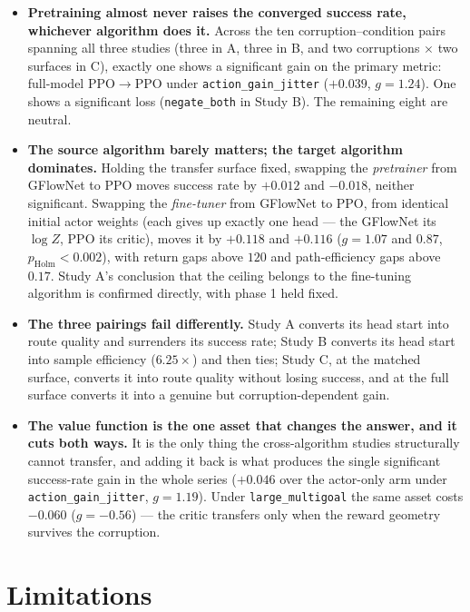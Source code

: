 \begin{itemize}
  \item \textbf{Pretraining almost never raises the converged success rate, whichever algorithm does it.} Across the ten corruption--condition pairs spanning all three studies (three in A, three in B, and two corruptions $\times$ two surfaces in C), exactly one shows a significant gain on the primary metric: full-model PPO$\rightarrow$PPO under \texttt{action\_gain\_jitter} ($+0.039$, $g=1.24$). One shows a significant loss (\texttt{negate\_both} in Study B). The remaining eight are neutral.
  \item \textbf{The source algorithm barely matters; the target algorithm dominates.} Holding the transfer surface fixed, swapping the \emph{pretrainer} from GFlowNet to PPO moves success rate by $+0.012$ and $-0.018$, neither significant. Swapping the \emph{fine-tuner} from GFlowNet to PPO, from identical initial actor weights (each gives up exactly one head --- the GFlowNet its $\log Z$, PPO its critic), moves it by $+0.118$ and $+0.116$ ($g=1.07$ and $0.87$, $p_{\mathrm{Holm}}<0.002$), with return gaps above $120$ and path-efficiency gaps above $0.17$. Study A's conclusion that the ceiling belongs to the fine-tuning algorithm is confirmed directly, with phase 1 held fixed.
  \item \textbf{The three pairings fail differently.} Study A converts its head start into route quality and surrenders its success rate; Study B converts its head start into sample efficiency ($6.25\times$) and then ties; Study C, at the matched surface, converts it into route quality without losing success, and at the full surface converts it into a genuine but corruption-dependent gain.
  \item \textbf{The value function is the one asset that changes the answer, and it cuts both ways.} It is the only thing the cross-algorithm studies structurally cannot transfer, and adding it back is what produces the single significant success-rate gain in the whole series ($+0.046$ over the actor-only arm under \texttt{action\_gain\_jitter}, $g=1.19$). Under \texttt{large\_multigoal} the same asset costs $-0.060$ ($g=-0.56$) --- the critic transfers only when the reward geometry survives the corruption.
\end{itemize}

\section{Limitations}

